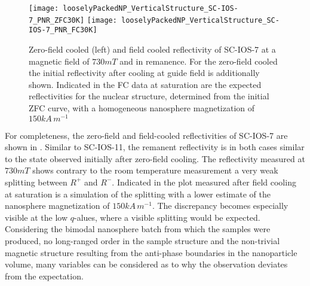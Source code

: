 \documentclass[\main/dresen_thesis.tex]{subfiles}
\begin{document}
  \begin{figure}[tb]
    \centering
    \texttt{[image: looselyPackedNP\_VerticalStructure\_SC-IOS-7\_PNR\_ZFC30K]}
    \texttt{[image: looselyPackedNP\_VerticalStructure\_SC-IOS-7\_PNR\_FC30K]}
    \caption{\label{fig:looselyPackedNP:layer:ZFCFCIOS7}Zero-field cooled (left) and field cooled reflectivity of SC-IOS-7 at a magnetic field of $730 \unit{mT}$ and in remanence. For the zero-field cooled the initial reflectivity after cooling at guide field is additionally shown. Indicated in the FC data at saturation are the expected reflectivities for the nuclear structure, determined from the initial ZFC curve, with a homogeneous nanosphere magnetization of $150 \unit{kA \, m^{-1}}$}
  \end{figure}

  For completeness, the zero-field and field-cooled reflectivities of SC-IOS-7 are shown in .
  Similar to SC-IOS-11, the remanent reflectivity is in both cases similar to the state observed initially after zero-field cooling.
  The reflectivity measured at $730 \unit{mT}$ shows contrary to the room temperature measurement a very weak splitting between $R^{+}$ and $R^{-}$.
  Indicated in the plot measured after field cooling at saturation is a simulation of the splitting with a lower estimate of the nanosphere magnetization of $150 \unit{kA \, m^{-1}}$.
  The discrepancy becomes especially visible at the low $q$-alues, where a visible splitting would be expected.
  Considering the bimodal nanosphere batch from which the samples were produced, no long-ranged order in the sample structure and the non-trivial magnetic structure resulting from the anti-phase boundaries in the nanoparticle volume, many variables can be considered as to why the observation deviates from the expectation.
\end{document}
